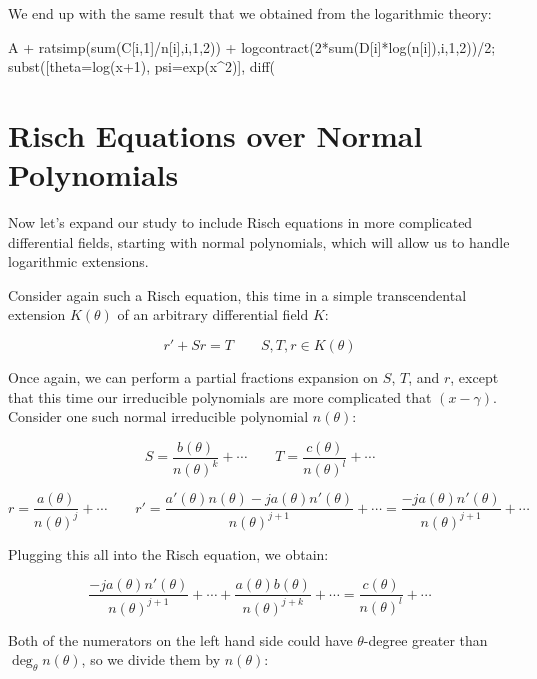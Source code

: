 \begin{comment}
\begin{maximablock}
rest(arrayinfo(D),2);
map(lambda([u], arraymake(D,u)), %
map(display,%
/* displayarray(D); */
\end{maximablock}
\end{comment}

We end up with
the same result that we obtained from the logarithmic theory:

\begin{maximablock}
A + ratsimp(sum(C[i,1]/n[i],i,1,2))
  + logcontract(2*sum(D[i]*log(n[i]),i,1,2))/2;
subst([theta=log(x+1), psi=exp(x^2)], %
diff(%
\end{maximablock}

\endexample

\vfill\eject
\section{Risch Equations over Normal Polynomials}

Now let's expand our study to include Risch equations in more
complicated differential fields, starting with normal polynomials,
which will allow us to handle logarithmic extensions.

Consider again such a Risch equation, this time in a simple
transcendental extension $K(\theta)$ of an arbitrary differential
field $K$:

$$r' + S r = T \qquad S,T,r \in K(\theta)$$

Once again, we can perform a partial fractions expansion on $S$, $T$,
and $r$, except that this time our irreducible polynomials are more
complicated that $(x-\gamma)$.  Consider one such normal irreducible
polynomial $n(\theta)$:

$$S = \frac{b(\theta)}{n(\theta)^k} + \cdots
\qquad T = \frac{c(\theta)}{n(\theta)^l} + \cdots$$

$$r = \frac{a(\theta)}{n(\theta)^j} + \cdots  \qquad
r' = \frac{a'(\theta)n(\theta)-ja(\theta)n'(\theta)}{n(\theta)^{j+1}} + \cdots = \frac{-ja(\theta)n'(\theta)}{n(\theta)^{j+1}} + \cdots$$

Plugging this all into the Risch equation, we obtain:

$$\frac{-ja(\theta)n'(\theta)}{n(\theta)^{j+1}} + \cdots + \frac{a(\theta) b(\theta)}{n(\theta)^{j+k}} + \cdots = \frac{c(\theta)}{n(\theta)^l} + \cdots$$

Both of the numerators on the left hand side could have $\theta$-degree greater than $\deg_\theta n(\theta)$,
so we divide them by $n(\theta)$:

